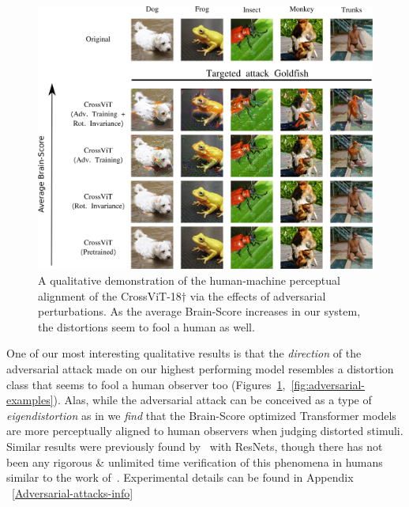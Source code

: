 \documentclass{article} %
\begin{document}
\begin{figure}
\includegraphics[scale=0.065]{src/adv_1-min.png}
\caption{A qualitative demonstration of the human-machine perceptual alignment of the CrossViT-18$\dagger$ via the effects of adversarial perturbations. As the average Brain-Score increases in our system, the distortions seem to fool a human as well.}
\label{fig:short}
\end{figure}One of our most interesting qualitative results is that the \textit{direction} of the adversarial attack made on our highest performing model resembles a distortion class that seems to fool a human observer too (Figures~\ref{fig:short},~\ref{fig:adversarial-examples}). Alas, while the adversarial attack can be conceived as a type of \textit{eigendistortion} as in \cite{berardino2017eigen} we \textit{find} that the Brain-Score optimized Transformer models are more perceptually aligned to human observers when judging distorted stimuli. Similar results were previously found by~\cite{santurkar2019image} with ResNets, though there has not been any rigorous \& unlimited time verification of this phenomena in humans similar to the work of~\cite{elsayed2018adversarial}. Experimental details can be found in  Appendix ~\ref{Adversarial-attacks-info}
\end{document}
